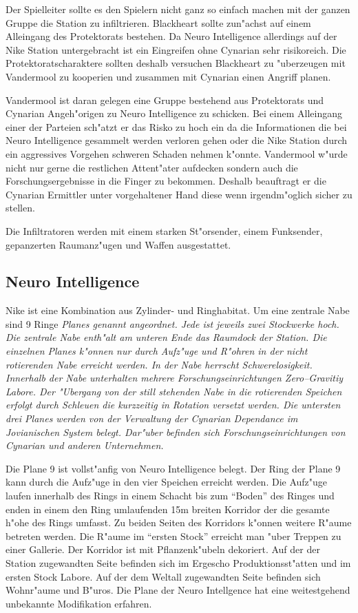 \begin{remarks}
Der Spielleiter sollte es den Spielern nicht ganz so einfach machen mit der ganzen Gruppe die Station zu infiltrieren. Blackheart sollte zun"achst auf einem Alleingang des Protektorats bestehen. Da Neuro Intelligence allerdings auf der Nike Station untergebracht ist ein Eingreifen ohne Cynarian sehr risikoreich. Die Protektoratscharaktere sollten deshalb versuchen Blackheart zu "uberzeugen mit Vandermool zu kooperien und zusammen mit Cynarian einen Angriff planen.

Vandermool ist daran gelegen eine Gruppe bestehend aus Protektorats und Cynarian Angeh"origen zu Neuro Intelligence zu schicken. Bei einem Alleingang einer der Parteien sch"atzt er das Risko zu hoch ein da\3 die Informationen die bei Neuro Intelligence gesammelt werden verloren gehen oder die Nike Station durch ein aggressives Vorgehen schweren Schaden nehmen k"onnte. Vandermool w"urde nicht nur gerne die restlichen Attent"ater aufdecken sondern auch die Forschungsergebnisse in die Finger zu bekommen. Deshalb beauftragt er die Cynarian Ermittler unter vorgehaltener Hand diese wenn irgendm"oglich sicher zu stellen.

Die Infiltratoren werden mit einem starken St"orsender, einem Funksender, gepanzerten Raumanz"ugen und Waffen ausgestattet.
\end{remarks}

\subsection{Neuro Intelligence}

Nike ist eine Kombination aus Zylinder- und Ringhabitat. Um eine zentrale Nabe sind 9 Ringe \em{Planes} genannt angeordnet. Jede ist jeweils zwei Stockwerke hoch. Die zentrale Nabe enth"alt am unteren Ende das Raumdock der Station.  Die einzelnen Planes k"onnen nur durch Aufz"uge und R"ohren in der nicht rotierenden Nabe erreicht werden. In der Nabe herrscht Schwerelosigkeit. Innerhalb der Nabe unterhalten mehrere Forschungseinrichtungen Zero--Gravitiy Labore. Der "Ubergang von der still stehenden Nabe in die rotierenden Speichen erfolgt durch Schleu\3en die kurzzeitig in Rotation versetzt werden. Die untersten drei Planes werden von der Verwaltung der Cynarian Dependance im Jovianischen System belegt. Dar"uber befinden sich Forschungseinrichtungen von Cynarian und anderen Unternehmen.

Die Plane 9 ist vollst"anfig von Neuro Intelligence belegt. Der Ring der Plane 9 kann durch die Aufz"uge in den vier Speichen erreicht werden. Die Aufz"uge laufen innerhalb des Rings in einem Schacht bis zum ``Boden'' des Ringes und enden in einem den Ring umlaufenden 15m breiten Korridor der die gesamte h"ohe des Rings umfasst. Zu beiden Seiten des Korridors k"onnen weitere R"aume betreten werden. Die R"aume im ``ersten Stock'' erreicht man "uber Treppen zu einer Gallerie. Der Korridor ist mit Pflanzenk"ubeln dekoriert. Auf der der Station zugewandten Seite befinden sich im Ergescho\3 Produktionsst"atten und im ersten Stock Labore. Auf der dem Weltall zugewandten Seite befinden sich Wohnr"aume und B"uros. Die Plane der Neuro Intellgence hat eine weitestgehend unbekannte Modifikation erfahren.

